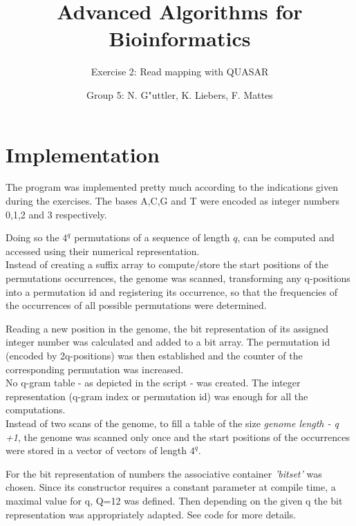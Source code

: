 \documentclass[11pt, notitlepage]{scrartcl}
\begin{document}
         


\title{Advanced Algorithms for Bioinformatics} 
\subtitle{Exercise 2: Read mapping with QUASAR}
\author{Group 5: N. G"uttler, K. Liebers, F. Mattes} %
\maketitle

\section{Implementation}
The program was implemented pretty much according to the indications given during the exercises. The bases A,C,G and T were encoded as integer numbers 0,1,2 and 3 respectively.

Doing so the $4^q$ permutations of a sequence of length $q$, can be computed and accessed using their numerical representation.\\ 
Instead of creating a suffix array to compute/store the start positions of the permutations occurrences, the genome was
scanned, transforming any q-positions into a permutation id and registering its occurrence, so that the frequencies of the occurrences of all possible permutations were determined.

Reading a new position in the genome, the bit representation of its assigned integer number was calculated and added to
a bit array.
The permutation id (encoded by 2q-positions) was then established and the counter of the corresponding permutation was increased. \\
No q-gram table - as depicted in the script - was created. The integer representation (q-gram index or permutation
id) was enough for all the computations.\\
Instead of two scans of the genome, to fill a table of the size \textit{genome length - q +1}, the genome was scanned
only once and the start positions of the occurrences were stored in a vector of vectors of length $4^q$.

For the bit representation of numbers the associative container \textit{'bitset'} was chosen. Since its constructor requires a constant parameter at compile time, a maximal value for q, Q=12 was defined. Then depending on the given q the bit representation was appropriately adapted. 
See code for more details.   
\end{document}

